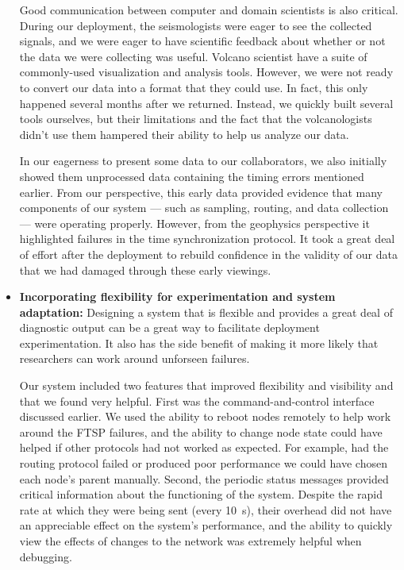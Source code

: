 \begin{itemize}
Good communication between computer and domain scientists is also critical.
During our deployment, the seismologists were eager to see the collected
signals, and we were eager to have scientific feedback about whether or not
the data we were collecting was useful. Volcano scientist have a suite of
commonly-used visualization and analysis tools. However, we were not ready to
convert our data into a format that they could use. In fact, this only
happened several months after we returned. Instead, we quickly built several
tools ourselves, but their limitations and the fact that the volcanologists
didn't use them hampered their ability to help us analyze our data.

In our eagerness to present some data to our collaborators, we also initially
showed them unprocessed data containing the timing errors mentioned earlier.
From our perspective, this early data provided evidence that many components
of our system --- such as sampling, routing, and data collection --- were
operating properly. However, from the geophysics perspective it highlighted
failures in the time synchronization protocol. It took a great deal of effort
after the deployment to rebuild confidence in the validity of our data that
we had damaged through these early viewings.

\item \textbf{Incorporating flexibility for experimentation and system
adaptation:} Designing a system that is flexible and provides a great deal of
diagnostic output can be a great way to facilitate deployment
experimentation. It also has the side benefit of making it more likely that
researchers can work around unforseen failures.

Our system included two features that improved flexibility and visibility and
that we found very helpful. First was the command-and-control interface
discussed earlier. We used the ability to reboot nodes remotely to help work
around the FTSP failures, and the ability to change node state could have
helped if other protocols had not worked as expected. For example, had the
routing protocol failed or produced poor performance we could have chosen
each node's parent manually. Second, the periodic status messages provided
critical information about the functioning of the system. Despite the rapid
rate at which they were being sent (every 10~s), their overhead did not have
an appreciable effect on the system's performance, and the ability to quickly
view the effects of changes to the network was extremely helpful when
debugging.


\end{itemize}
